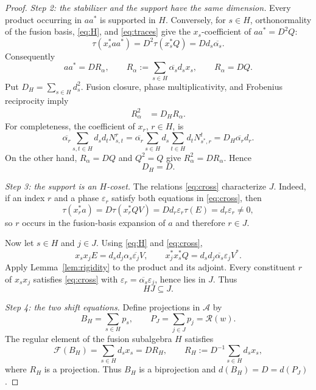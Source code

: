 \documentclass[11pt]{amsart}
\newcommand{\A}{\mathcal A}
\newcommand{\F}{\mathcal F}
\newcommand{\Rng}{\mathcal R}
\begin{document}
\begin{proof}
\medskip\noindent
\emph{Step 2: the stabilizer and the support have the same dimension.}
Every product occurring in $aa^*$ is supported in $H$.  Conversely, for
$s\in H$, orthonormality of the fusion basis, \eqref{eq:H}, and
\eqref{eq:traces} give the $x_s$-coefficient of $aa^*=D^2Q$:
\[
 \tau(x_s^*aa^*)
 =D^2\tau(x_s^*Q)
 =Dd_s\overline{\alpha_s}.
\]
Consequently
\begin{equation}\label{eq:regularphase}
 aa^*=D R_\alpha,
 \qquad
 R_\alpha:=\sum_{s\in H}\overline{\alpha_s}d_sx_s,
 \qquad
 R_\alpha=DQ.
\end{equation}
Put $D_H=\sum_{s\in H}d_s^2$.  Fusion closure, phase multiplicativity, and
Frobenius reciprocity imply
\begin{align*}
 R_\alpha^2
 &=D_HR_\alpha.
\end{align*}
For completeness, the coefficient of $x_r$, $r\in H$, is
\[
 \overline{\alpha_r}
 \sum_{s,t\in H}d_sd_tN_{s,t}^r
 =\overline{\alpha_r}
 \sum_{s\in H}d_s\sum_{t\in H}d_tN_{s^*,r}^{t}
 =D_H\overline{\alpha_r}d_r.
\]
On the other hand, $R_\alpha=DQ$ and $Q^2=Q$ give
$R_\alpha^2=DR_\alpha$.  Hence
\begin{equation}\label{eq:Dequal}
 D_H=D.
\end{equation}

\medskip\noindent
\emph{Step 3: the support is an $H$-coset.}
The relations \eqref{eq:cross} characterize $J$.  Indeed, if an index $r$
and a phase $\varepsilon_r$ satisfy both equations in \eqref{eq:cross}, then
\[
 \tau(x_r^*a)
 =D\tau(x_r^*QV)
 =Dd_r\varepsilon_r\tau(E)
 =d_r\varepsilon_r\ne0,
\]
so $r$ occurs in the fusion-basis expansion of $a$ and therefore $r\in J$.

Now let $s\in H$ and $j\in J$.  Using \eqref{eq:H} and
\eqref{eq:cross},
\[
 x_sx_jE=d_sd_j\alpha_s\overline{\varepsilon_j}V,
 \qquad
 x_j^*x_s^*Q
 =d_sd_j\overline{\alpha_s}\varepsilon_jV^*.
\]
Apply Lemma~\ref{lem:rigidity} to the product and its adjoint.  Every
constituent $r$ of $x_sx_j$ satisfies \eqref{eq:cross} with
$\varepsilon_r=\overline{\alpha_s}\varepsilon_j$, hence lies in $J$.
Thus
\begin{equation}\label{eq:HJ}
 HJ\subseteq J.
\end{equation}

\medskip\noindent
\emph{Step 4: the two shift equations.}
Define projections in $\A$ by
\[
 B_H=\sum_{s\in H}p_s,
 \qquad
 P_J=\sum_{j\in J}p_j=\Rng(w).
\]
The regular element of the fusion subalgebra $H$ satisfies
\[
 \F(B_H)=\sum_{s\in H}d_sx_s
 =D R_H,
 \qquad
 R_H:=D^{-1}\sum_{s\in H}d_sx_s,
\]
where $R_H$ is a projection.  Thus $B_H$ is a biprojection and
$d(B_H)=D=d(P_J)$.


\end{proof}
\end{document}
